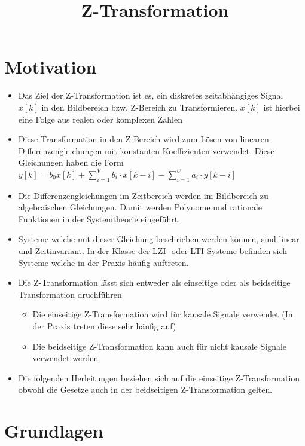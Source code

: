 \documentclass[11pt]{article}
\title{Z-Transformation}
\providecommand{\tightlist}{%
      \setlength{\itemsep}{0pt}\setlength{\parskip}{0pt}}
\begin{document}
    
    
    \maketitle
    
    

    
    \section{Motivation}\label{motivation}

\begin{itemize}
\item
  Das Ziel der Z-Transformation ist es, ein diskretes zeitabhängiges
  Signal \(x[k]\) in den Bildbereich bzw. Z-Bereich zu Transformieren.
  \(x[k]\) ist hierbei eine Folge aus realen oder komplexen Zahlen
\item
  Diese Transformation in den Z-Bereich wird zum Lösen von linearen
  Differenzengleichungen mit konstanten Koeffizienten verwendet. Diese
  Gleichungen haben die Form
  \(y[k] = b_0 x[k] + \sum_{i=1}^V b_i \cdot x[k-i] - \sum_{i=1}^U a_i \cdot y[k-i]\)
\item
  Die Differenzengleichungen im Zeitbereich werden im Bildbereich zu
  algebraischen Gleichungen. Damit werden Polynome und rationale
  Funktionen in der Systemtheorie eingeführt.
\item
  Systeme welche mit dieser Gleichung beschrieben werden können, sind
  linear und Zeitinvariant. In der Klasse der LZI- oder LTI-Systeme
  befinden sich Systeme welche in der Praxis häufig auftreten.
\item
  Die Z-Transformation lässt sich entweder als einseitige oder als
  beidseitige Transformation druchführen

  \begin{itemize}
  \tightlist
  \item
    Die einseitige Z-Transformation wird für kausale Signale verwendet
    (In der Praxis treten diese sehr häufig auf)
  \item
    Die beidseitige Z-Transformation kann auch für nicht kausale Signale
    verwendet werden
  \end{itemize}
\item
  Die folgenden Herleitungen beziehen sich auf die einseitige
  Z-Transformation obwohl die Gesetze auch in der beidseitigen
  Z-Transformation gelten.
\end{itemize}

    \section{Grundlagen}\label{grundlagen}
\end{document}
